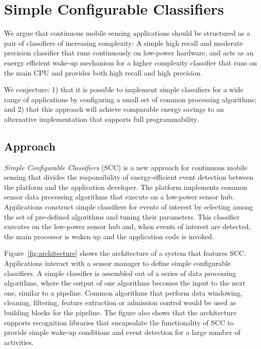 \section{Simple Configurable Classifiers}
\label{sec:conjecture}

We argue that continuous mobile sensing applications should be
structured as a pair of classifiers of increasing complexity: A simple
high recall and moderate precision classifier that runs continuously
on low-power hardware, and acts as an energy efficient wake-up
mechanism for a higher complexity classifier that runs on the main CPU
and provides both high recall and high precision.

We conjecture: 1) that it is possible to implement simple classifiers for a 
wide range of applications by configuring a small set of common processing 
algorithms; and  2) that this approach will achieve comparable energy 
savings to an alternative implementation that supports full programmability.

\subsection {Approach}

{\em Simple Configurable Classifiers} (SCC) is a new approach for
continuous mobile sensing that divides the responsibility of
energy-efficient event detection between the platform and
the application developer.  The platform implements common sensor data
processing algorithms that execute on a low-power sensor hub.
Applications construct simple classifiers for events of interest by
selecting among the set of pre-defined 
algorithms and tuning their parameters.  This classifier executes on
the low-power sensor hub and, when events of interest are detected,
the main processor is woken up and the application code is invoked.
  
Figure~\ref{fig:architecture} shows the architecture of a
system that features SCC. Applications interact with a sensor 
manager to define simple configurable classifiers. A simple 
classifier is assembled out of a series of data processing
algorithms, where the output of one algorithms becomes the input to
the next one, similar to a pipeline.  Common algorithms
that perform data windowing, cleaning, filtering, feature extraction 
or admission control would be used as building blocks for the 
pipeline.  The figure also
shows that the architecture supports recognition libraries that
encapsulate the functionality of SCC to provide simple
wake-up conditions and event detection for a large number of activities. 


